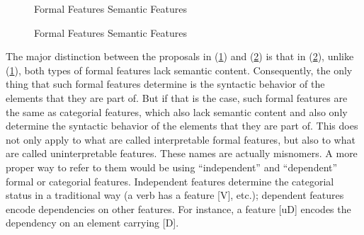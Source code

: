 \documentclass[output=paper
,modfonts
,nonflat]{langsci/langscibook}
\begin{document}
\begin{figure}[!h]
\begin{exe}
\ex \hspace{1.5cm} Formal Features \hspace{0.8cm} Semantic Features \label{ex-zeijlstra:10} \\
\end{exe} \vspace{-0.5cm}
\end{figure}
\begin{figure}[!h]
\begin{exe}
\ex \hspace{1.5cm} Formal Features \hspace{2.5cm} Semantic Features \label{ex-zeijlstra:11}\\ 
\end{exe} \vspace{-0.8cm}
\end{figure}
\newpage \noindent The major distinction between the proposals in (\ref{ex-zeijlstra:10}) and (\ref{ex-zeijlstra:11}) is that in (\ref{ex-zeijlstra:11}), unlike (\ref{ex-zeijlstra:10}), both types of formal features lack semantic content. Consequently, the only thing that such formal features determine is the syntactic behavior of the elements that they are part of. But if that is the case, such formal features are the same as categorial features, which also lack semantic content and also only determine the syntactic behavior of the elements that they are part of. This does not only apply to what are called interpretable formal features, but also to what are called uninterpretable features. These names are actually misnomers. A more proper way to refer to them would be using ``independent'' and ``dependent'' formal or categorial features. Independent features determine the categorial status in a traditional way (a verb has a feature [V], etc.); dependent features encode dependencies on other features. For instance, a feature [uD] encodes the dependency on an element carrying [D].
\end{document}
